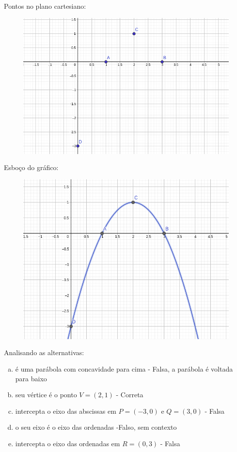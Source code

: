 \begin{multicols*}{2}
\begin{enumerate}[wide, labelwidth=!, labelindent=0pt]
              Pontos no plano cartesiano:
              \begin{figure}[H]
                  \centering
                  \includegraphics[width=\columnwidth]{assets/rafael/img18.png}
              \end{figure}
              Esboço do gráfico:
              \begin{figure}[H]
                  \centering
                  \includegraphics[width=\columnwidth]{assets/rafael/img19.png}
              \end{figure}

    \end{enumerate}
    Analisando as alternativas:
    \begin{enumerate}[(a)]
        \item é uma parábola com concavidade para cima - Falsa, a parábola é voltada para baixo
        \item seu vértice é o ponto $V = (2,1)$ - Correta
        \item intercepta o eixo das abscissas em  $P = (-3,0)$ e $Q = (3,0)$ - Falsa
        \item o seu eixo é o eixo das ordenadas -Falso, sem contexto
        \item intercepta o eixo das ordenadas em $R = (0,3)$ - Falsa
    \end{enumerate}


\end{multicols*}
